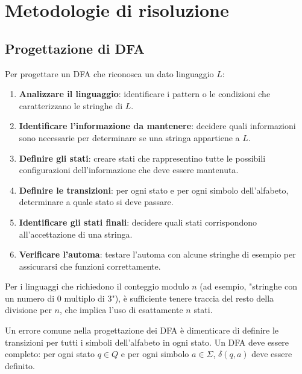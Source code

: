 \documentclass[12pt,a4paper]{article}
\begin{document}
\section{Metodologie di risoluzione}

\subsection{Progettazione di DFA}

\begin{risoluzione}
Per progettare un DFA che riconosca un dato linguaggio $L$:

\begin{enumerate}
  \item \textbf{Analizzare il linguaggio}: identificare i pattern o le condizioni che caratterizzano le stringhe di $L$.
  \item \textbf{Identificare l'informazione da mantenere}: decidere quali informazioni sono necessarie per determinare se una stringa appartiene a $L$.
  \item \textbf{Definire gli stati}: creare stati che rappresentino tutte le possibili configurazioni dell'informazione che deve essere mantenuta.
  \item \textbf{Definire le transizioni}: per ogni stato e per ogni simbolo dell'alfabeto, determinare a quale stato si deve passare.
  \item \textbf{Identificare gli stati finali}: decidere quali stati corrispondono all'accettazione di una stringa.
  \item \textbf{Verificare l'automa}: testare l'automa con alcune stringhe di esempio per assicurarsi che funzioni correttamente.
\end{enumerate}
\end{risoluzione}

\begin{suggerimento}
Per i linguaggi che richiedono il conteggio modulo $n$ (ad esempio, "stringhe con un numero di 0 multiplo di 3"), è sufficiente tenere traccia del resto della divisione per $n$, che implica l'uso di esattamente $n$ stati.
\end{suggerimento}

\begin{errorecomune}
Un errore comune nella progettazione dei DFA è dimenticare di definire le transizioni per tutti i simboli dell'alfabeto in ogni stato. Un DFA deve essere completo: per ogni stato $q \in Q$ e per ogni simbolo $a \in \Sigma$, $\delta(q, a)$ deve essere definito.
\end{errorecomune}
\end{document}
